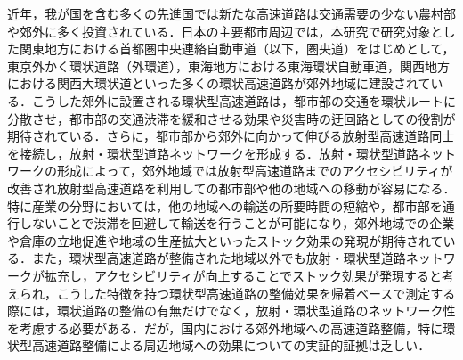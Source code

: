 近年，我が国を含む多くの先進国では新たな高速道路は交通需要の少ない農村部や郊外に多く投資されている．日本の主要都市周辺では，本研究で研究対象とした関東地方における首都圏中央連絡自動車道（以下，圏央道）をはじめとして，東京外かく環状道路（外環道），東海地方における東海環状自動車道，関西地方における関西大環状道といった多くの環状高速道路が郊外地域に建設されている．こうした郊外に設置される環状型高速道路は，都市部の交通を環状ルートに分散させ，都市部の交通渋滞を緩和させる効果や災害時の迂回路としての役割が期待されている．さらに，都市部から郊外に向かって伸びる放射型高速道路同士を接続し，放射・環状型道路ネットワークを形成する．放射・環状型道路ネットワークの形成によって，郊外地域では放射型高速道路までのアクセシビリティが改善され放射型高速道路を利用しての都市部や他の地域への移動が容易になる．特に産業の分野においては，他の地域への輸送の所要時間の短縮や，都市部を通行しないことで渋滞を回避して輸送を行うことが可能になり，郊外地域での企業や倉庫の立地促進や地域の生産拡大といったストック効果の発現が期待されている．また，環状型高速道路が整備された地域以外でも放射・環状型道路ネットワークが拡充し，アクセシビリティが向上することでストック効果が発現すると考えられ，こうした特徴を持つ環状型高速道路の整備効果を帰着ベースで測定する際には，環状道路の整備の有無だけでなく，放射・環状型道路のネットワーク性を考慮する必要がある．だが，国内における郊外地域への高速道路整備，特に環状型高速道路整備による周辺地域への効果についての実証的証拠は乏しい．
